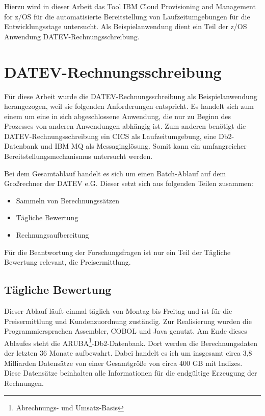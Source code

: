 Hierzu wird in dieser Arbeit das Tool \glqq IBM Cloud Provisioning and Management for z/OS\grqq{} für die automatisierte Bereitstellung von Laufzeitumgebungen für die Entwicklungsstage untersucht.
Als Beispielanwendung dient ein Teil der z/OS Anwendung \glqq DATEV-Rechnungsschreibung\grqq.

\section{DATEV-Rechnungsschreibung}\label{rechBesch}
Für diese Arbeit wurde die DATEV-Rechnungsschreibung als Beispielanwendung herangezogen, weil sie folgenden Anforderungen entspricht.
Es handelt sich zum einem um eine in sich abgeschlossene Anwendung, die nur zu Beginn des Prozesses von anderen Anwendungen abhängig ist.
Zum anderen benötigt die DATEV-Rechnungsschreibung ein CICS als Laufzeitumgebung, eine Db2-Datenbank und IBM MQ als Messaginglösung.
Somit kann ein umfangreicher Bereitstellungsmechanismus untersucht werden.

Bei dem Gesamtablauf handelt es sich um einen Batch-Ablauf auf dem Großrechner der DATEV e.G.
Dieser setzt sich aus folgenden Teilen zusammen:
\begin{itemize}
\item Sammeln von Berechnungssätzen
\item Tägliche Bewertung
\item Rechnungsaufbereitung
\end{itemize}
Für die Beantwortung der Forschungsfragen ist nur ein Teil der \glqq Tägliche Bewertung\grqq{} relevant, die Preisermittlung.

\subsection{Tägliche Bewertung}\label{sssec:täglbew}
Dieser Ablauf läuft einmal täglich von Montag bis Freitag und ist für die Preisermittlung und Kundenzuordnung zuständig.
Zur Realisierung wurden die Programmiersprachen Assembler, COBOL und Java genutzt.
Am Ende dieses Ablaufes steht die ARUBA\footnote{Abrechnungs- und Umsatz-Basis}-Db2-Datenbank.
Dort werden die Berechnungsdaten der letzten 36 Monate aufbewahrt.
Dabei handelt es ich um insgesamt circa 3,8 Milliarden Datensätze von einer Gesamtgröße von circa 400 GB mit Indizes.
Diese Datensätze beinhalten alle Informationen für die endgültige Erzeugung der Rechnungen.

